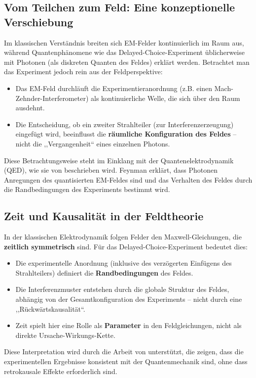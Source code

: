 \documentclass[12pt,a4paper]{article}
\begin{document}
\subsection{Vom Teilchen zum Feld: Eine konzeptionelle Verschiebung}
Im klassischen Verständnis breiten sich EM-Felder kontinuierlich im Raum aus, während Quantenphänomene wie das Delayed-Choice-Experiment üblicherweise mit Photonen (als diskreten Quanten des Feldes) erklärt werden. Betrachtet man das Experiment jedoch rein aus der Feldperspektive:
\begin{itemize}
	\item Das EM-Feld durchläuft die Experimentieranordnung (z.B. einen Mach-Zehnder-Interferometer) als kontinuierliche Welle, die sich über den Raum ausdehnt.
	\item Die Entscheidung, ob ein zweiter Strahlteiler (zur Interferenzerzeugung) eingefügt wird, beeinflusst die \textbf{räumliche Konfiguration des Feldes} -- nicht die ,,Vergangenheit`` eines einzelnen Photons.
\end{itemize}

Diese Betrachtungsweise steht im Einklang mit der Quantenelektrodynamik (QED), wie sie von \cite{feynman1985qed} beschrieben wird. Feynman erklärt, dass Photonen Anregungen des quantisierten EM-Feldes sind und das Verhalten des Feldes durch die Randbedingungen des Experiments bestimmt wird.

\subsection{Zeit und Kausalität in der Feldtheorie}
In der klassischen Elektrodynamik folgen Felder den Maxwell-Gleichungen, die \textbf{zeitlich symmetrisch} sind. Für das Delayed-Choice-Experiment bedeutet dies:
\begin{itemize}
	\item Die experimentelle Anordnung (inklusive des verzögerten Einfügens des Strahlteilers) definiert die \textbf{Randbedingungen} des Feldes.
	\item Die Interferenzmuster entstehen durch die globale Struktur des Feldes, abhängig von der Gesamtkonfiguration des Experiments -- nicht durch eine ,,Rückwärtskausalität``.
	\item Zeit spielt hier eine Rolle als \textbf{Parameter} in den Feldgleichungen, nicht als direkte Ursache-Wirkungs-Kette.
\end{itemize}

Diese Interpretation wird durch die Arbeit von \cite{jacques2007} unterstützt, die zeigen, dass die experimentellen Ergebnisse konsistent mit der Quantenmechanik sind, ohne dass retrokausale Effekte erforderlich sind.
\end{document}
